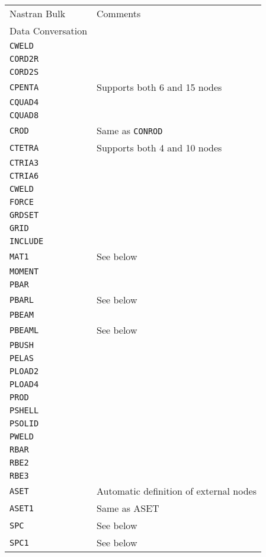 \begin{tabular}{| m{} |  m{} |}
  \hline
  \rowcolor[HTML]{EFEFEF} Nastran Bulk      & Comments \\
  \rowcolor[HTML]{EFEFEF} Data Conversation &          \\
  \hline\hline
  {\tt CWELD}  & \\\hline
  {\tt CORD2R} & \\\hline
  {\tt CORD2S} & \\\hline
  {\tt CPENTA} & Supports both 6 and 15 nodes \\\hline
  {\tt CQUAD4} & \\\hline
  {\tt CQUAD8} & \\\hline
  {\tt CROD}   & Same as {\tt CONROD} \\\hline
  {\tt CTETRA} & Supports both 4 and 10 nodes \\\hline
  {\tt CTRIA3} & \\\hline
  {\tt CTRIA6} & \\\hline
  {\tt CWELD}  & \\\hline
  {\tt FORCE}  & \\\hline
  {\tt GRDSET} & \\\hline
  {\tt GRID}   & \\\hline
  {\tt INCLUDE} & \\\hline
  {\tt MAT1}   & See below \\\hline
  {\tt MOMENT} & \\\hline
  {\tt PBAR}   & \\\hline
  {\tt PBARL}  & See below \\\hline
  {\tt PBEAM}  & \\\hline
  {\tt PBEAML} & See below \\\hline
  {\tt PBUSH}  & \\\hline
  {\tt PELAS}  & \\\hline
  {\tt PLOAD2} & \\\hline
  {\tt PLOAD4} & \\\hline
  {\tt PROD}   & \\\hline
  {\tt PSHELL} & \\\hline
  {\tt PSOLID} & \\\hline
  {\tt PWELD}  & \\\hline
  {\tt RBAR}   & \\\hline
  {\tt RBE2}   & \\\hline
  {\tt RBE3}   & \\\hline
  {\tt ASET}   & Automatic definition of external nodes \\\hline
  {\tt ASET1}  & Same as ASET \\\hline
  {\tt SPC}    & See below \\\hline
  {\tt SPC1}   & See below \\\hline
\end{tabular}

